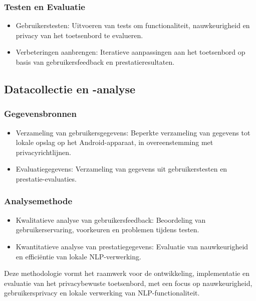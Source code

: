 \subsubsection{Testen en Evaluatie}
\begin{itemize}
    \item Gebruikerstesten: Uitvoeren van tests om functionaliteit, nauwkeurigheid en pri\-va\-cy \linebreak van het toetsenbord te evalueren.
    \item Verbeteringen aanbrengen: Iteratieve aanpassingen aan het toetsenbord op basis van gebruikersfeedback en prestatieresultaten.
\end{itemize}

\subsection{Datacollectie en -analyse}

\subsubsection{Gegevensbronnen}
\begin{itemize}
    \item Verzameling van gebruikersgegevens: Beperkte verzameling van gegevens tot lokale opslag op het Android-apparaat, in overeenstemming met privacyrichtlijnen.
    \item Evaluatiegegevens: Verzameling van gegevens uit gebruikerstesten en prestatie-eva\-lu\-a\-ties.
\end{itemize}

\subsubsection{Analysemethode}
\begin{itemize}
    \item Kwalitatieve analyse van gebruikersfeedback: Beoordeling van gebruikerservaring, voorkeuren en problemen tijdens testen.
    \item Kwantitatieve analyse van prestatiegegevens: Evaluatie van nauwkeurigheid en efficiëntie van lokale NLP-verwerking.
\end{itemize}


Deze methodologie vormt het raamwerk voor de ontwikkeling, implementatie en evaluatie van het privacybewuste toetsenbord, met een focus op nauwkeurigheid, gebruikersprivacy en lokale verwerking van NLP-functionaliteit.


